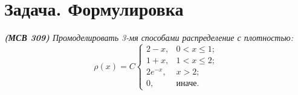 \documentclass[specialist,
substylefile = spbu_report.rtx,
subf,href,colorlinks=true, 12pt]{disser}
\begin{document}
	
	
	
	\author{Яковлев Денис Михайлович\\
		Группа 21.Б04-мм\\
		\textsc{095998@student.spbu.ru}}
	
	\date{\today}
	
	\maketitle
	\newpage
	\thispagestyle{empty}
	\tableofcontents
	\newpage
	\section{Задача. Формулировка}
	\textit{\textbf{(МСВ 309)} Промоделировать 3-мя способами распределение с плотностью:}
	\begin{equation*}
		\rho(x)=C
		\begin{cases}
			2-x, & 0 < x \leqslant 1;\\
			1+x, & 1 < x \leqslant 2;\\
			2e^{-x}, & x > 2;\\
			0, & \textit{иначе}.	
		\end{cases}
	\end{equation*}
\end{document}
